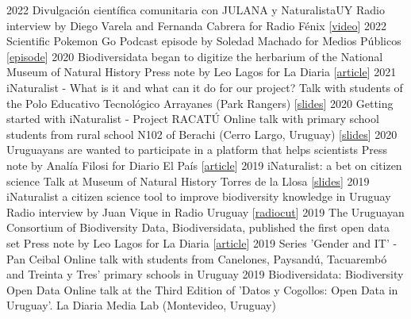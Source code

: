 \documentclass[9pt]{developercv} %
\begin{document}
\begin{entrylist}
	\entrylong
		{2022}
		{Divulgación científica comunitaria con JULANA y NaturalistaUY}
		{}
		{Radio interview by Diego Varela and Fernanda Cabrera for Radio Fénix [\href{https://youtu.be/Scc01vg1PTs}{video}]}
	\entrylong
		{2022}
		{Scientific Pokemon Go}
		{}
		{Podcast episode by Soledad Machado for Medios Públicos [\href{https://open.spotify.com/episode/05X1u40HyvvTjuuYKjyJE2?si=jCNZ8hHmQ8S-CSfiNOCryQ}{episode}]}
	\entrylong
		{2020}
		{Biodiversidata began to digitize the herbarium of the National Museum of Natural History}
		{}
		{Press note by Leo Lagos for La Diaria [\href{https://ciencia.ladiaria.com.uy/articulo/2020/2/biodiversidata-comenzo-a-digitalizar-el-herbario-del-museo-nacional-de-historia-natural}{article}]}
	\entrylong
		{2021}
		{iNaturalist - What is it and what can it do for our project?}
		{}
		{Talk with students of the Polo Educativo Tecnológico Arrayanes (Park Rangers) [\href{https://flograttarola.com/pdf/Arrayanes_iNatUY.pdf}{slides}]}
	\entrylong
		{2020}
		{Getting started with iNaturalist - Project RACATÚ}
		{}
		{Online talk with primary school students from rural school N102 of Berachi (Cerro Largo, Uruguay) [\href{https://flograttarola.com/pdf/iNat_Berachi.pdf}{slides}]}
	\entrylong
		{2020}
		{Uruguayans are wanted to participate in a platform that helps scientists}
		{}
		{Press note by Analía Filosi for Diario El País [\href{https://www.elpais.com.uy/vida-actual/busca-uruguayos-participen-plataforma-ayuda-cientificos.html}{article}]}
	\entrylong
		{2019}
		{iNaturalist: a bet on citizen science}
		{}
		{Talk at Museum of Natural History Torres de la Llosa [\href{https://flograttarola.com/pdf/NaturalistaUy.pdf}{slides}]}
	\entrylong
		{2019}
		{iNaturalist a citizen science tool to improve biodiversity knowledge in Uruguay}
		{}
		{Radio interview by Juan Vique in Radio Uruguay [\href{https://radiouruguay.uy/inaturalist-una-apuesta-a-la-ciencia-ciudadana/}{radiocut}]}
	\entrylong
		{2019}
		{The Uruguayan Consortium of Biodiversity Data, Biodiversidata, published the first open data set}
		{}
		{Press note by Leo Lagos for La Diaria [\href{https://ciencia.ladiaria.com.uy/articulo/2019/7/el-consorcio-de-datos-de-biodiversidad-de-uruguay-biodiversidata-publico-el-primer-set-de-datos-abiertos/}{article}]}
	\entrylong
		{2019}
		{Series 'Gender and IT' -  Pan Ceibal}
		{}
		{Online talk with students from Canelones, Paysandú, Tacuarembó and Treinta y Tres' primary schools in Uruguay}
	\entrylong
		{2019}
		{Biodiversidata: Biodiversity Open Data}
		{}
		{Online talk at the Third Edition of 'Datos y Cogollos: Open Data in Uruguay'. La Diaria Media Lab (Montevideo, Uruguay)}

\end{entrylist}
\end{document}

